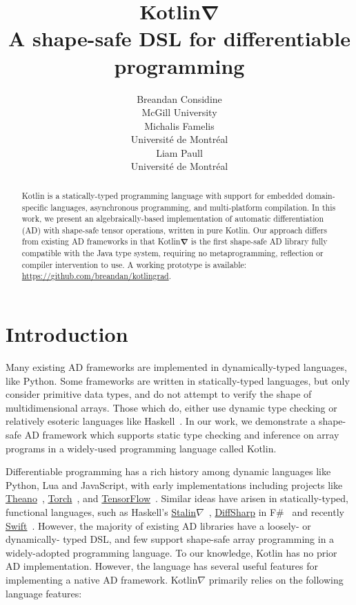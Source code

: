 \documentclass{article}
\title{Kotlin$\mathbf{\nabla}$\\\large{A shape-safe DSL for differentiable programming}}
\author{
   Breandan Considine\\
   McGill University\\
   \And
   Michalis Famelis\\
   Universit{\'e} de Montr{\'e}al\\
   \And
   Liam Paull \\
   Universit{\'e} de Montr{\'e}al\\
}
\begin{document}
\maketitle

\begin{abstract}Kotlin is a statically-typed programming language with support for embedded domain-specific languages, asynchronous programming, and multi-platform compilation. In this work, we present an algebraically-based implementation of automatic differentiation (AD) with shape-safe tensor operations, written in pure Kotlin. Our approach differs from existing AD frameworks in that Kotlin$\mathbf{\nabla}$ is the first shape-safe AD library fully compatible with the Java type system, requiring no metaprogramming, reflection or compiler intervention to use. A working prototype is available: \url{https://github.com/breandan/kotlingrad}.\end{abstract}

\section{Introduction}

Many existing AD frameworks are implemented in dynamically-typed languages, like Python. Some frameworks are written in statically-typed languages, but only consider primitive data types, and do not attempt to verify the shape of multidimensional arrays. Those which do, either use dynamic type checking or relatively esoteric languages like Haskell~\citep{pineyro2019structure}. In our work, we demonstrate a shape-safe AD framework which supports static type checking and inference on array programs in a widely-used programming language called Kotlin.

Differentiable programming has a rich history among dynamic languages like Python, Lua and JavaScript, with early implementations including projects like \href{http://deeplearning.net/software/theano/}{Theano}~\citep{bergstra2010theano}, \href{http://torch.ch/}{Torch}~\citep{collobert2002torch}, and \href{http://tensorflow.org/}{TensorFlow}~\citep{abadi2016tensorflow}. Similar ideas have arisen in statically-typed, functional languages, such as Haskell's \href{https://github.com/Functional-AutoDiff/STALINGRAD}{Stalin$\nabla$}~\citep{pearlmutter2008using}, \href{http://diffsharp.github.io/DiffSharp/}{DiffSharp} in F\#~\citep{baydin2015diffsharp} and recently \href{https://www.tensorflow.org/swift}{Swift}~\citep{lattner2018tensorflow}. However, the majority of existing AD libraries have a loosely- or dynamically- typed DSL, and few support shape-safe array programming in a widely-adopted programming language. To our knowledge, Kotlin has no prior AD implementation. However, the language has several useful features for implementing a native AD framework. Kotlin$\nabla$ primarily relies on the following language features:
\end{document}
